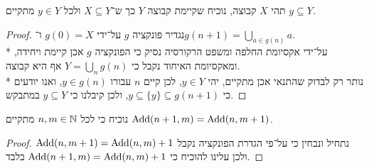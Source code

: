 \Question{}
תהי $X$ קבוצה, נוכיח שקיימת קבוצה $Y$ כך ש־$X \subseteq Y$ ולכל $y \in Y$ מתקיים $y \subseteq Y$.
\begin{proof}
	נגדיר פונקציה $g$ על־ידי $g(0) = X$ ו־$g(n + 1) = \bigcup_{a \in g(n)} a$. \\*
	על־ידי אקסיומת החלפה ומשפט הרקורסיה נסיק כי הפונקציה $g$ אכן קיימת ויחידה, ומאקסיומת האיחוד נקבל כי $Y = \bigcup_n g(n)$ אף היא קבוצה. \\*
	נותר רק לבדוק שהתנאי אכן מתקיים, יהי $y \in Y$, לכן קיים $n$ עבורו $y \in g(n)$, ואנו יודעים כי $y \subseteq \{ y \} \subseteq g(n + 1)$, ולכן קיבלנו כי $y \subseteq Y$ במתבקש.
\end{proof}

\Question{}
\Subquestion{}
נוכיח כי לכל $n, m \in \mathbb{N}$ מתקיים $\operatorname{Add}(n + 1, m) = \operatorname{Add}(n, m + 1)$.
\begin{proof}
	נתחיל ונבחין כי על־פי הגדרת הפונקציה נקבל $\operatorname{Add}(n, m + 1) = \operatorname{Add}(n, m) + 1$ ולכן עלינו להוכיח כי $\operatorname{Add}(n + 1, m) = \operatorname{Add}(n, m) + 1$ בלבד.
\end{proof}



